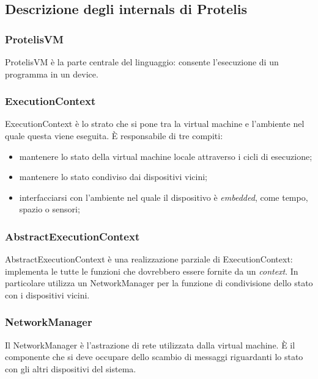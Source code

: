 \subsection{Descrizione degli internals di Protelis}

\subsubsection{ProtelisVM}

ProtelisVM è la parte centrale del linguaggio: consente l'esecuzione di un programma in un device.

\subsubsection{ExecutionContext}

ExecutionContext è lo strato che si pone tra la virtual machine e l'ambiente nel quale questa viene eseguita. È responsabile di tre compiti:

\begin{itemize}
    \item{mantenere lo stato della virtual machine locale attraverso i cicli di esecuzione;}

    \item{mantenere lo stato condiviso dai dispositivi vicini;}

    \item{interfacciarsi con l'ambiente nel quale il dispositivo è \textit{embedded}, come tempo, spazio o sensori;}
\end{itemize}

\subsubsection{AbstractExecutionContext}

AbstractExecutionContext è una realizzazione parziale di ExecutionContext: implementa le tutte le funzioni che dovrebbero essere fornite da un \textit{context}. In particolare utilizza un NetworkManager per la funzione di condivisione dello stato con i dispositivi vicini.

\subsubsection{NetworkManager}

Il NetworkManager è l'astrazione di rete utilizzata dalla virtual machine. È il componente che si deve occupare dello scambio di messaggi riguardanti lo stato con gli altri dispositivi del sistema.

